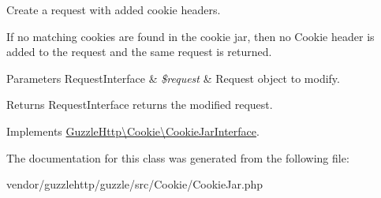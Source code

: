 Create a request with added cookie headers.

If no matching cookies are found in the cookie jar, then no Cookie header is added to the request and the same request is returned.


\begin{DoxyParams}[1]{Parameters}
Request\+Interface & {\em \$request} & Request object to modify.\\
\hline
\end{DoxyParams}
\begin{DoxyReturn}{Returns}
Request\+Interface returns the modified request. 
\end{DoxyReturn}


Implements \hyperlink{interfaceGuzzleHttp_1_1Cookie_1_1CookieJarInterface_a677129d290a059ebd29b00663b63c051}{Guzzle\+Http\textbackslash{}\+Cookie\textbackslash{}\+Cookie\+Jar\+Interface}.



The documentation for this class was generated from the following file\+:\begin{DoxyCompactItemize}
\item 
vendor/guzzlehttp/guzzle/src/\+Cookie/Cookie\+Jar.\+php\end{DoxyCompactItemize}

